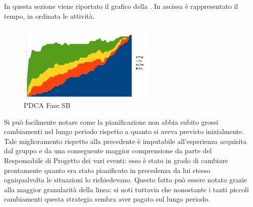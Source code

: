 		In questa sezione viene riportato il grafico  della . In ascissa è rappresentato il tempo, in ordinata le attività.
		\begin{figure}[H]
			\centering
			\includegraphics[width=0.6\textwidth]{PianoDiQualifica/Pics/GraficoPDCAFaseSD.pdf}
			\caption{PDCA Fase SB}
		\end{figure}
		Si può facilmente notare come la pianificazione non abbia subito grossi cambiamenti nel lungo periodo rispetto a quanto si aveva previsto inizialmente. Tale miglioramento rispetto alla  precedente è imputabile all'esperienza acquisita dal gruppo e da una conseguente maggior comprensione da parte del Responsabile di Progetto dei vari eventi: esso è stato in grado di cambiare prontamente quanto era stato pianificato in precedenza da lui stesso ogniqualvolta le situazioni lo richiedevano. Questo fatto può essere notato grazie alla maggior granularità della linea: si noti tuttavia che nonostante i tanti piccoli cambiamenti questa strategia sembra aver pagato sul lungo periodo.
